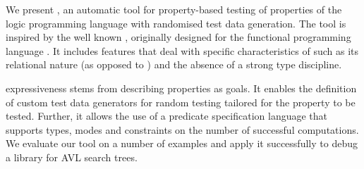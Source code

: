 

We present \plqc{}, an automatic tool for property-based
testing of properties of the logic programming language \Prolog{} with
randomised test data generation.
%
The tool is 
inspired by
the well known \QuickCheck, originally designed
for the functional programming language \Haskell{}. 
It
includes 
features that deal with specific characteristics of \Prolog{} such as
its relational nature (as opposed to \Haskell{}) and the absence
of a strong type discipline.


\plqc{} expressiveness stems from describing properties as
\Prolog{} goals.
%
It enables the definition of custom test data generators for
random testing
tailored for the property to be tested.
%
Further, it allows the use of a predicate specification language that
supports types, modes and constraints on the number of successful
computations.
%
We evaluate our tool on a number of  examples and apply
it successfully to debug a \Prolog{} library for AVL search trees.

